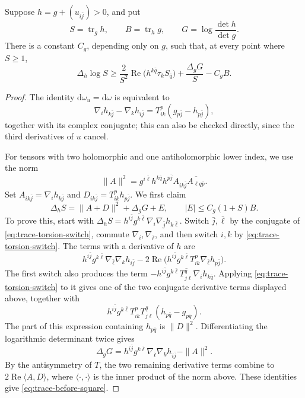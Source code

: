 \begin{lemma}\label{lem:hermitian-trace-inequality}
Suppose $h=g+(u_{i\bar j})>0$, and put
\[
 S=\operatorname{tr}_gh,\qquad B=\operatorname{tr}_hg,
 \qquad G=\log\frac{\det h}{\det g}.
\]
There is a constant $C_g$, depending only on $g$, such that, at every point where $S\geq1$,
\begin{equation}\label{eq:hermitian-trace-inequality}
 \Delta_h\log S\geq
 \frac2{S^2}\operatorname{Re}\bigl(h^{k\bar q}\tau_k S_{\bar q}\bigr)
 +\frac{\Delta_gG}{S}-C_gB.
\end{equation}
\end{lemma}
\begin{proof}
The identity $\mathrm{d}\omega_u=\mathrm{d}\omega$ is equivalent to
\begin{equation}\label{eq:trace-torsion-switch}
 \nabla_i h_{k\bar j}-\nabla_k h_{i\bar j}
 =T_{ik}^p(g_{p\bar j}-h_{p\bar j}),
\end{equation}
together with its complex conjugate; this can also be checked directly, since the third derivatives of $u$ cancel.

For tensors with two holomorphic and one antiholomorphic lower index, we use the norm
\[
 \|A\|^2=g^{i\bar\ell}h^{k\bar q}h^{p\bar j}
 A_{ik\bar j}\overline{A_{\ell q\bar p}}.
\]
Set $A_{ik\bar j}=\nabla_i h_{k\bar j}$ and
$D_{ik\bar j}=T_{ik}^p h_{p\bar j}$. We first claim
\begin{equation}\label{eq:trace-before-square}
 \Delta_hS=\|A+D\|^2+\Delta_gG+E,
 \qquad |E|\leq C_g(1+S)B.
\end{equation}
To prove this, start with
$\Delta_hS=h^{i\bar j}g^{k\bar\ell}\nabla_i\nabla_{\bar j}h_{k\bar\ell}$.
Switch $\bar j,\bar\ell$ by the conjugate of \eqref{eq:trace-torsion-switch}, commute $\nabla_i,\nabla_{\bar\ell}$, and then switch $i,k$ by \eqref{eq:trace-torsion-switch}. The terms with a derivative of $h$ are
\[
 h^{i\bar j}g^{k\bar\ell}\nabla_{\bar\ell}\nabla_kh_{i\bar j}
 -2\operatorname{Re}\bigl(h^{i\bar j}g^{k\bar\ell}
             T_{ik}^p\nabla_{\bar\ell}h_{p\bar j}\bigr).
\]
The first switch also produces the term
$-h^{i\bar j}g^{k\bar\ell}\overline{T_{j\ell}^q}\nabla_i h_{k\bar q}$.
Applying \eqref{eq:trace-torsion-switch} to it gives one of the two conjugate derivative terms displayed above, together with
\[
 h^{i\bar j}g^{k\bar\ell}T_{ik}^p\overline{T_{j\ell}^q}
                   (h_{p\bar q}-g_{p\bar q}).
\]
The part of this expression containing $h_{p\bar q}$ is $\|D\|^2$. Differentiating the logarithmic determinant twice gives
\[
 \Delta_gG=h^{i\bar j}g^{k\bar\ell}
                \nabla_{\bar\ell}\nabla_kh_{i\bar j}-\|A\|^2.
\]
By the antisymmetry of $T$, the two remaining derivative terms combine to $2\operatorname{Re}\langle A,D\rangle$, where $\langle\cdot,\cdot\rangle$ is the inner product of the norm above. These identities give \eqref{eq:trace-before-square}.


\end{proof}
